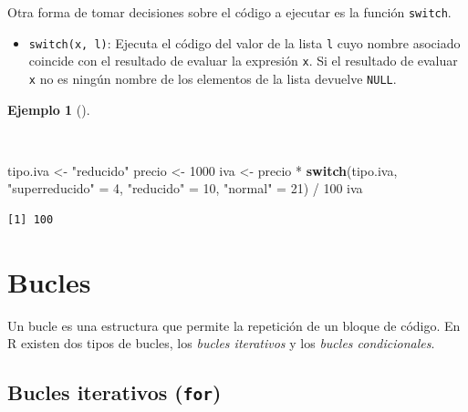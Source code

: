 \documentclass[
  spanish,
  a4paper,
]{scrreport}
\newenvironment{Shaded}{\begin{snugshade}}{\end{snugshade}}
\newcommand{\ControlFlowTok}[1]{\textcolor[rgb]{0.00,0.23,0.31}{\textbf{#1}}}
\newcommand{\DecValTok}[1]{\textcolor[rgb]{0.68,0.00,0.00}{#1}}
\newcommand{\NormalTok}[1]{\textcolor[rgb]{0.00,0.23,0.31}{#1}}
\newcommand{\OtherTok}[1]{\textcolor[rgb]{0.00,0.23,0.31}{#1}}
\newcommand{\SpecialCharTok}[1]{\textcolor[rgb]{0.37,0.37,0.37}{#1}}
\newcommand{\StringTok}[1]{\textcolor[rgb]{0.13,0.47,0.30}{#1}}
\providecommand{\tightlist}{%
  \setlength{\itemsep}{0pt}\setlength{\parskip}{0pt}}
\theoremstyle{definition}
\theoremstyle{definition}
\newtheorem{example}{Ejemplo}[chapter]
\theoremstyle{remark}
\begin{document}
Otra forma de tomar decisiones sobre el código a ejecutar es la función
\texttt{switch}.

\begin{itemize}
\tightlist
\item
  \texttt{switch(x,\ l)}: Ejecuta el código del valor de la lista
  \texttt{l} cuyo nombre asociado coincide con el resultado de evaluar
  la expresión \texttt{x}. Si el resultado de evaluar \texttt{x} no es
  ningún nombre de los elementos de la lista devuelve \texttt{NULL}.
\end{itemize}

\begin{example}[]\protect\hypertarget{exm-condicional-switch}{}\label{exm-condicional-switch}

~

\begin{Shaded}
\begin{Highlighting}[]
\NormalTok{tipo.iva }\OtherTok{\textless{}{-}} \StringTok{"reducido"}
\NormalTok{precio }\OtherTok{\textless{}{-}} \DecValTok{1000}
\NormalTok{iva }\OtherTok{\textless{}{-}}\NormalTok{ precio }\SpecialCharTok{*} \ControlFlowTok{switch}\NormalTok{(tipo.iva, }\StringTok{"superreducido"} \OtherTok{=} \DecValTok{4}\NormalTok{, }\StringTok{"reducido"} \OtherTok{=} \DecValTok{10}\NormalTok{, }\StringTok{"normal"} \OtherTok{=} \DecValTok{21}\NormalTok{) }\SpecialCharTok{/} \DecValTok{100}
\NormalTok{iva}
\end{Highlighting}
\end{Shaded}

\begin{verbatim}
[1] 100
\end{verbatim}

\end{example}

\section{Bucles}\label{bucles}

Un bucle es una estructura que permite la repetición de un bloque de
código. En R existen dos tipos de bucles, los \emph{bucles iterativos} y
los \emph{bucles condicionales}.

\subsection{\texorpdfstring{Bucles iterativos
(\texttt{for})}{Bucles iterativos (for)}}\label{bucles-iterativos-for}
\end{document}
